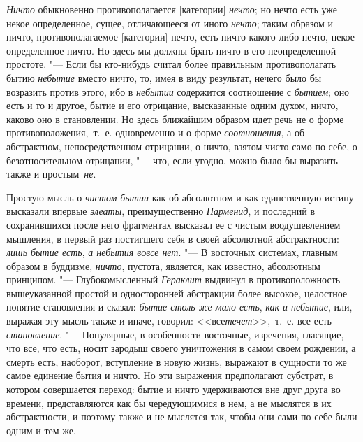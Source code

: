 {\em Ничто} обыкновенно противополагается [категории]
{\em нечто}; но нечто есть уже некое определенное,
сущее, отличающееся от иного {\em нечто}; таким
образом и ничто, противополагаемое [категории] нечто, есть ничто
какого-либо нечто, некое определенное ничто. Но здесь мы должны брать ничто
в его неопределенной простоте. "--- Если бы кто-нибудь считал более правильным
противополагать бытию {\em небытие} вместо ничто, то, имея
в виду результат, нечего было бы возразить против этого,
ибо в {\em небытии} содержится соотношение
с {\em бытием}; оно есть и то и другое, бытие и его
отрицание, высказанные одним духом, ничто, каково оно в становлении. Но
здесь ближайшим образом идет речь не о форме противоположения,~т.~е.
одновременно и о форме {\em соотношения}, а об
абстрактном, непосредственном отрицании, о ничто, взятом чисто само по
себе, о безотносительном отрицании, "--- что, если угодно, можно было бы
выразить также и простым~{\em не}.

Простую мысль о {\em чистом бытии} как об абсолютном и
как единственную истину высказали впервые {\em элеаты},
преимущественно {\em Парменид}, и последний в
сохранившихся после него фрагментах высказал ее с чистым воодушевлением
мышления, в первый раз постигшего себя в своей абсолютной абстрактности:
{\em лишь бытие есть}, {\em а
небытия вовсе нет}. "--- В восточных системах, главным образом в буддизме,
{\em ничто}, пустота, является, как известно,
абсолютным принципом. "--- Глубокомысленный {\em Гераклит}
выдвинул в противоположность вышеуказанной простой и односторонней
абстракции более высокое, целостное понятие становления и сказал:
{\em бытие столь же мало есть},
{\em как и небытие}, или, выражая эту мысль также и
иначе, говорил: <<все{\em  течет}>>,~т.~е. все есть
{\em становление}. "--- Популярные, в особенности
восточные, изречения, гласящие, что все, что есть, носит зародыш своего
уничтожения в самом своем рождении, а смерть есть, наоборот, вступление в
новую жизнь, выражают в сущности то же самое единение бытия и ничто. Но эти
выражения предполагают субстрат, в котором совершается переход: бытие и
ничто удерживаются вне друг друга во времени, представляются как бы
чередующимися в нем, а не мыслятся в их абстрактности, и поэтому также и не
мыслятся так, чтобы они сами по себе были одним и тем же.

